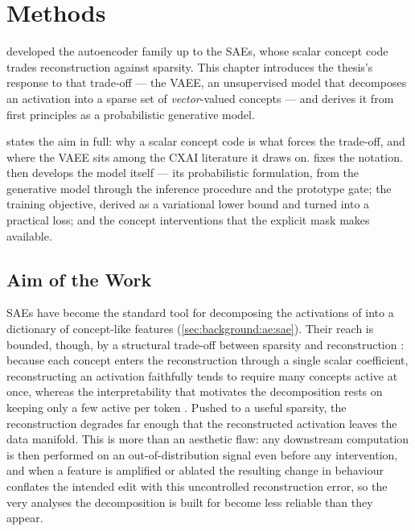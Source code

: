 \chapter{Methods} \label{ch:methods}

 developed the
autoencoder family up to the \acp{SAE}, whose scalar concept code trades
reconstruction against sparsity. This chapter introduces the thesis's response
to that trade-off --- the \ac{VAEE}, an unsupervised model that decomposes an
activation into a sparse set of \textit{vector}-valued concepts --- and derives
it from first principles as a probabilistic generative model.

 states the aim in full:
why a scalar concept code is what forces the trade-off, and where the \ac{VAEE}
sits among the \ac{CXAI} literature it draws on. 
fixes the notation. 
then develops the model itself --- its probabilistic formulation, from the
generative model through the inference procedure and the prototype gate; the
training objective, derived as a variational lower bound and turned into a
practical loss; and the concept interventions that the explicit mask makes
available.

\section{Aim of the Work} \label{sec:methods:aim}

\Acp{SAE} have become the standard tool for decomposing the activations of
 into a dictionary of concept-like features
(\cref{sec:background:ae:sae}). Their
reach is bounded, though, by a structural trade-off between sparsity and
reconstruction \citep{gaoScalingEvaluatingSparse2024}: because each concept
enters the reconstruction through a single scalar coefficient, reconstructing an
activation faithfully tends to require many concepts active at once, whereas the
interpretability that motivates the decomposition rests on keeping only a few
active per token \citep{hubenSparseAutoencodersFind2023,
brickenMonosemanticityDecomposingLanguage2023}. Pushed to a useful sparsity, the
reconstruction degrades far enough that the reconstructed activation leaves the
data manifold. This is more than an aesthetic flaw: any downstream computation
is then performed on an out-of-distribution signal even before any intervention,
and when a feature is amplified or ablated the resulting change in behaviour
conflates the intended edit with this uncontrolled reconstruction error, so the
very analyses the decomposition is built for become less reliable than they
appear.

